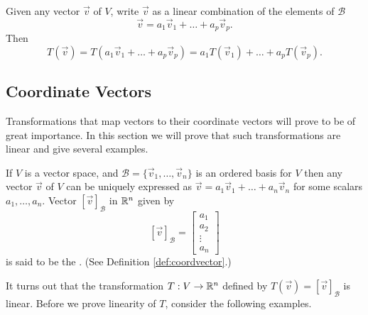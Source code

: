 \documentclass{ximera}
\begin{document}
Given any vector $\vec{v}$ of $V$, write $\vec{v}$ as a linear combination of the elements of $\mathcal{B}$
$$\vec{v}=a_1\vec{v}_1+\ldots+a_p\vec{v}_p.$$ 
Then
$$T(\vec{v})=T(a_1\vec{v}_1+\ldots+a_p\vec{v}_p)=a_1T(\vec{v}_1)+\ldots+a_pT(\vec{v}_p).$$







\subsection*{Coordinate Vectors}
Transformations that map vectors to their coordinate vectors will prove to be of great importance.  In this section we will prove that such transformations are linear and give several examples.

If $V$ is a vector space, and  $\mathcal{B}=\{\vec{v}_1, \ldots ,\vec{v}_n\}$ is an ordered basis for $V$ then any vector $\vec{v}$ of $V$ can be uniquely expressed as $\vec{v}=a_1\vec{v}_1+\ldots +a_n\vec{v}_n$ for some scalars $a_1, \ldots ,a_n$.  Vector $[\vec{v}]_{\mathcal{B}}$ in $\mathbb{R}^n$ given by 
$$[\vec{v}]_{\mathcal{B}}=\begin{bmatrix}a_1\\a_2\\\vdots\\a_n\end{bmatrix}$$
is said to be the .  (See Definition \ref{def:coordvector}.)  

It turns out that the transformation $T:V\rightarrow \mathbb{R}^n$ defined by $T(\vec{v})=[\vec{v}]_{\mathcal{B}}$ is linear.  Before we prove linearity of $T$, consider the following examples.
\end{document}
